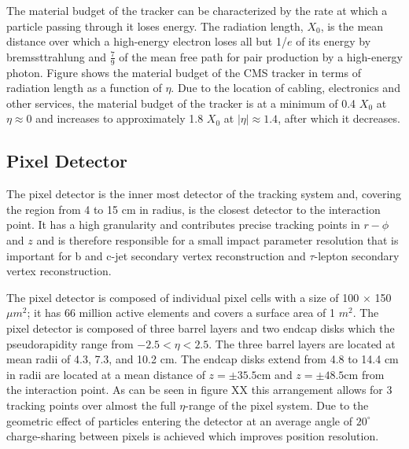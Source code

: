 \documentclass[oneside, letterpaper, 12pt, oldfontcommands]{memoir}
\begin{document}
The material budget of the tracker can be characterized by the rate at which a particle
passing through it loses energy. The radiation length, $X_{0}$, is the 
mean distance over which a high-energy electron loses all but 1/$e$ of its energy by bremssttrahlung %
and $\frac{7}{9}$ of the mean free path for pair production by a high-energy photon. Figure %
shows the material budget of the CMS tracker in terms of radiation length as a function of $\eta$. 
Due to the location of cabling, electronics and other services, the material budget of the 
tracker is at a minimum of 0.4 $X_{0}$ at $\eta \approx 0$ and increases to approximately 1.8 $X_{0}$
at $|\eta| \approx 1.4$, after which it decreases. 

\subsection{Pixel Detector}%
The pixel detector is the inner most detector of the tracking system and, %
covering the region from 4 to 15 cm in radius, is the closest detector to 
the interaction point. It has a high granularity and contributes precise 
tracking points in $r-\phi$ and $z$ and is therefore responsible for a small impact 
parameter resolution that is important for b and c-jet secondary
vertex reconstruction and $\tau$-lepton secondary vertex reconstruction.

The pixel detector is composed of individual pixel cells with a size of 
100 $\times$ 150 $\mu m^{2}$; it has 66 million active elements and covers
a surface area of 1 $m^{2}$. The pixel detector is composed of three barrel 
layers and two endcap disks which the pseudorapidity range from $-2.5<\eta<2.5$.
The three barrel layers are located at mean radii of 4.3, 7.3, and 10.2 cm. 
The endcap disks extend from 4.8 to 14.4 cm in radii are located at a mean distance
of $z=\pm35.5$cm and $z=\pm48.5$cm from the interaction point. 
As can be seen in figure XX this arrangement allows for 3 tracking points over %
almost the full $\eta$-range of the pixel system. Due to the geometric effect 
of particles entering the detector at an average angle of $20^{\circ}$ %
charge-sharing between pixels is achieved which improves position resolution.
\end{document}
